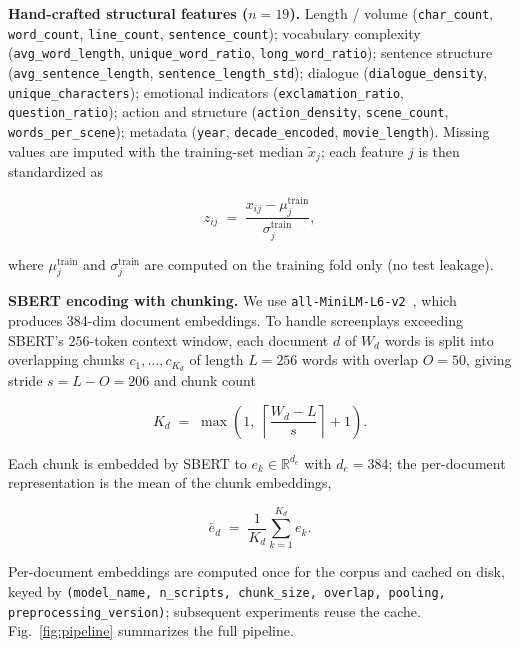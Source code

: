 \documentclass[runningheads]{llncs}
\begin{document}
\noindent\textbf{Hand-crafted structural features ($n=19$).}
Length / volume (\texttt{char\_count}, \texttt{word\_count},
\texttt{line\_count}, \texttt{sentence\_count}); vocabulary
complexity (\texttt{avg\_word\_length}, \texttt{unique\_word\_ratio},
\texttt{long\_word\_ratio}); sentence structure
(\texttt{avg\_sentence\_length}, \texttt{sentence\_length\_std});
dialogue (\texttt{dialogue\_density}, \texttt{unique\_characters});
emotional indicators (\texttt{exclamation\_ratio},
\texttt{question\_ratio}); action and structure
(\texttt{action\_density}, \texttt{scene\_count},
\texttt{words\_per\_scene}); metadata (\texttt{year},
\texttt{decade\_encoded}, \texttt{movie\_length}). Missing values
are imputed with the training-set median $\tilde{x}_{j}$; each
feature $j$ is then standardized as

\begin{equation}
z_{ij} \;=\; \frac{x_{ij} - \mu_{j}^{\text{train}}}{\sigma_{j}^{\text{train}}},
\label{eq:zscore}
\end{equation}

where $\mu_{j}^{\text{train}}$ and $\sigma_{j}^{\text{train}}$ are
computed on the training fold only (no test leakage).

\noindent\textbf{SBERT encoding with chunking.}
We use \texttt{all-MiniLM-L6-v2}~\cite{ref2}, which produces 384-dim
document embeddings. To handle screenplays exceeding SBERT's
$256$-token context window, each document $d$ of $W_{d}$ words is
split into overlapping chunks $c_{1}, \dots, c_{K_{d}}$ of length
$L = 256$ words with overlap $O = 50$, giving stride $s = L - O =
206$ and chunk count

\begin{equation}
K_{d} \;=\; \max\!\left(1,\; \left\lceil \frac{W_{d} - L}{s} \right\rceil + 1\right).
\label{eq:chunkcount}
\end{equation}

Each chunk is embedded by SBERT to $e_{k} \in \mathbb{R}^{d_{e}}$
with $d_{e} = 384$; the per-document representation is the mean of
the chunk embeddings,

\begin{equation}
\bar{e}_{d} \;=\; \frac{1}{K_{d}} \sum_{k=1}^{K_{d}} e_{k}.
\label{eq:meanpool}
\end{equation}

Per-document embeddings are computed once for the corpus and
cached on disk, keyed by \texttt{(model\_name, n\_scripts,
chunk\_size, overlap, pooling, preprocessing\_version)};
subsequent experiments reuse the cache. Fig.~\ref{fig:pipeline}
summarizes the full pipeline.
\end{document}
